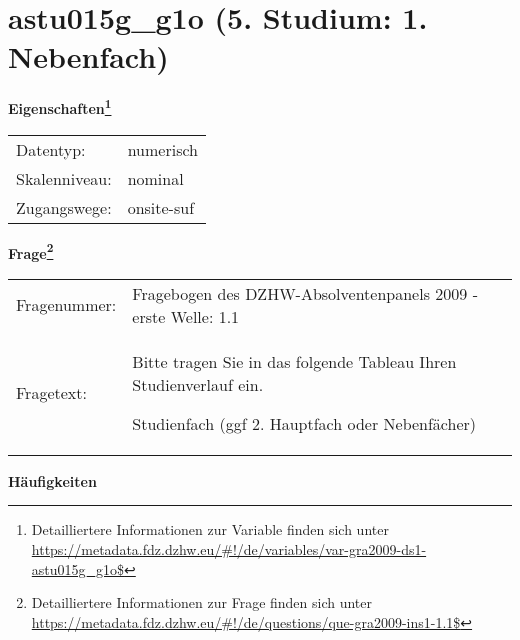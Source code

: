 
    \setcounter{footnote}{0}

    \vspace*{-1.8cm}
	\section{astu015g\_g1o (5. Studium: 1. Nebenfach)}
	\label{section:astu015g_g1o}



    \vspace*{0.5cm}
    \noindent\textbf{Eigenschaften\footnote{Detailliertere Informationen zur Variable finden sich unter
		\url{https://metadata.fdz.dzhw.eu/\#!/de/variables/var-gra2009-ds1-astu015g_g1o$}}}\\
	\begin{tabularx}{\hsize}{@{}lX}
	Datentyp: & numerisch \\
	Skalenniveau: & nominal \\
	Zugangswege: &
	  onsite-suf
 \\
    \end{tabularx}



				\vspace*{0.5cm}
                \noindent\textbf{Frage\footnote{Detailliertere Informationen zur Frage finden sich unter
		              \url{https://metadata.fdz.dzhw.eu/\#!/de/questions/que-gra2009-ins1-1.1$}}}\\
				\begin{tabularx}{\hsize}{@{}lX}
					Fragenummer: &
					  Fragebogen des DZHW-Absolventenpanels 2009 - erste Welle:
					  1.1
 \\
					Fragetext: & Bitte tragen Sie in das folgende Tableau Ihren Studienverlauf ein.\par  Studienfach (ggf 2. Hauptfach oder Nebenfächer) \\
				\end{tabularx}





        		\vspace*{0.5cm}
                \noindent\textbf{Häufigkeiten}

